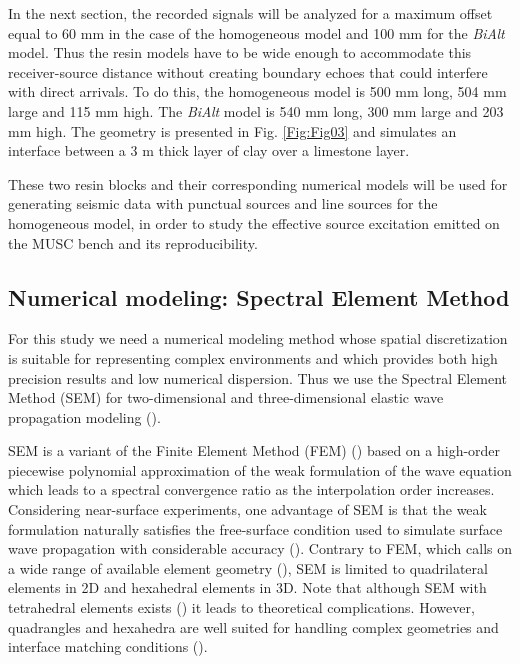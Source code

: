 \documentclass[extra,mreferee]{gji}
\newcommand{\bialt}{\textit{BiAlt} }
\begin{document}
In the next section, the recorded signals will be analyzed for a maximum offset equal to 60 mm in the case of the homogeneous model and 100 mm for the \bialt model. Thus the resin models have to be wide enough to accommodate this receiver-source distance without creating boundary echoes that could interfere with direct arrivals. To do this, the homogeneous model is 500 mm long, 504 mm large and 115 mm high. The \bialt model is 540 mm long, 300 mm large and 203 mm high. The geometry is presented in Fig. \ref{Fig:Fig03} and simulates an interface between a 3 m thick layer of clay over a limestone layer.

These two resin blocks and their corresponding numerical models will be used for generating seismic data with punctual sources and line sources for the homogeneous model, in order to study the effective source excitation emitted on the MUSC bench and its reproducibility.

\subsection{Numerical modeling: Spectral Element Method}

For this study we need a numerical modeling method whose spatial discretization is suitable for representing complex environments and which provides both high precision results and low numerical dispersion. Thus we use the Spectral Element Method (SEM) for two-dimensional and three-dimensional elastic wave propagation modeling (\cite{komatitsch1998spectral,komatitsch1999spectral,komatitsch2005spectral,Festa_PML_2005}). 

SEM is a variant of the Finite Element Method (FEM) (\cite{Lysmer_FEM_1972,Seron_FEM_1990,Hulbert_FEM_1990,Tromp_SEM_2008}) based on a high-order piecewise polynomial approximation of the weak formulation of the wave equation which leads to a spectral convergence ratio as the interpolation order increases. Considering near-surface experiments, one advantage of SEM is that the weak formulation naturally satisfies the free-surface condition used to simulate surface wave propagation with considerable accuracy (\cite{komatitsch1998spectral,komatitsch1999spectral,komatitsch2005spectral}). Contrary to FEM, which calls on a wide range of available element geometry (\cite{dhatt1984finite}), SEM is limited to quadrilateral elements in 2D and hexahedral elements in 3D. Note that although SEM with tetrahedral elements exists (\cite{komatitsch2001wave}) it leads to theoretical complications. However, quadrangles and hexahedra are well suited for handling complex geometries and interface matching conditions (\cite{Cristini_SEM_2012}). 
\end{document}
